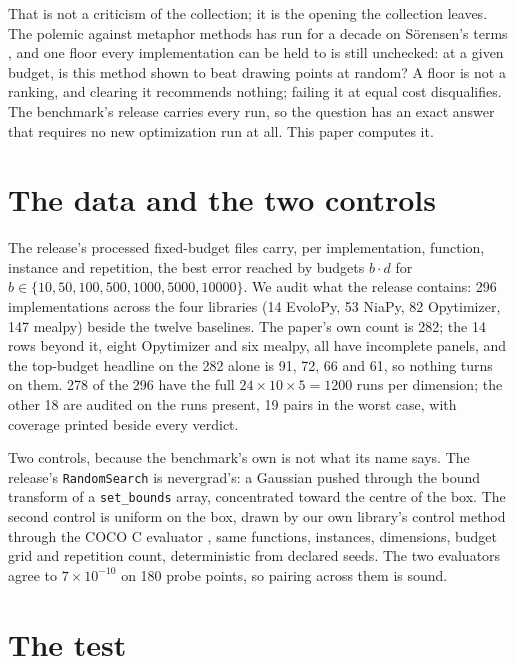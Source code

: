 \documentclass[11pt]{article}
\begin{document}
That is not a criticism of the collection; it is the opening the collection leaves. The
polemic against metaphor methods has run for a decade on S\"orensen's terms
\cite{sorensen15}, and one floor every implementation can be held to is still
unchecked: at a given budget, is this method shown to beat drawing points at random?
A floor is not a ranking, and clearing it recommends nothing; failing it at equal cost
disqualifies.
The benchmark's release \cite{zenodo} carries every run, so the question has an exact
answer that requires no new optimization run at all. This paper computes it.

\section{The data and the two controls}

The release's processed fixed-budget files carry, per implementation, function, instance
and repetition, the best error reached by budgets $b \cdot d$ for
$b \in \{10, 50, 100, 500, 1000, 5000, 10000\}$. We audit what the release contains: 296
implementations across the four libraries (14 EvoloPy, 53 NiaPy, 82 Opytimizer, 147
mealpy) beside the twelve baselines. The paper's own count is 282; the 14 rows beyond
it, eight Opytimizer and six mealpy, all have incomplete panels, and the top-budget
headline on the 282 alone is 91, 72, 66 and 61, so nothing turns on them. 278 of the
296 have the full
$24 \times 10 \times 5 = 1200$ runs per dimension; the other 18 are audited on the runs
present, 19 pairs in the worst case, with coverage printed beside every verdict.

Two controls, because the benchmark's own is not what its name says. The release's
\texttt{RandomSearch} is nevergrad's: a Gaussian pushed through the bound transform
of a \texttt{set\_bounds} array, concentrated toward the centre of the box. The
second control is uniform on the box, drawn by our own library's control method through
the COCO C evaluator \cite{coco}, same functions, instances, dimensions, budget grid and
repetition count, deterministic from declared seeds. The two evaluators agree to
$7 \times 10^{-10}$ on 180 probe points, so pairing across them is sound.

\section{The test}
\end{document}
